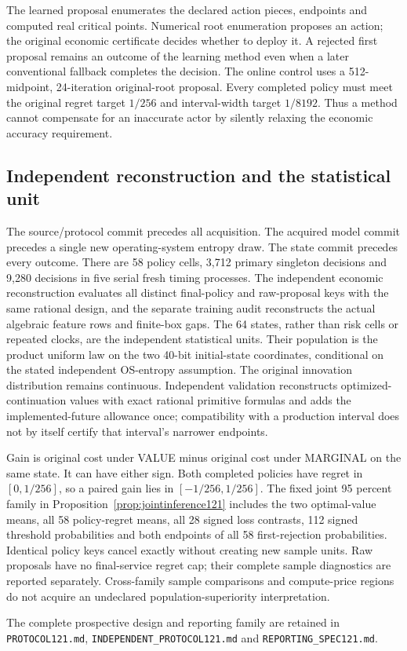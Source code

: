 The learned proposal enumerates the declared action pieces, endpoints and
computed real critical points. Numerical root enumeration proposes an action;
the original economic certificate decides whether to deploy it. A rejected
first proposal remains an outcome of the learning method even when a later
conventional fallback completes the decision. The online control uses a
512-midpoint, 24-iteration original-root proposal. Every completed policy must
meet the original regret target $1/256$ and interval-width target $1/8192$.
Thus a method cannot compensate for an inaccurate actor by silently relaxing
the economic accuracy requirement.

\subsection{Independent reconstruction and the statistical unit}
\label{subsec:validationdesign121}

The source/protocol commit precedes all acquisition. The acquired model
commit precedes a single new operating-system entropy draw. The state commit
precedes every outcome. There are 58 policy cells, 3,712 primary singleton
decisions and 9,280 decisions in five serial fresh timing processes. The
independent economic reconstruction evaluates all distinct final-policy and
raw-proposal keys with the same rational design, and the separate training
audit reconstructs the actual algebraic feature rows and finite-box gaps.
The 64 states, rather than risk cells or repeated clocks, are the independent
statistical units. Their population is the product uniform law on the two
40-bit initial-state coordinates, conditional on the stated independent
OS-entropy assumption. The original innovation distribution remains
continuous. Independent validation reconstructs optimized-continuation values
with exact rational primitive formulas and adds the implemented-future
allowance once; compatibility with a production interval does not by itself
certify that interval's narrower endpoints.

Gain is original cost under VALUE minus original cost under MARGINAL on the
same state. It can have either sign. Both completed policies have regret in
$[0,1/256]$, so a paired gain lies in $[-1/256,1/256]$. The fixed joint
95 percent family in Proposition~\ref{prop:jointinference121} includes the
two optimal-value means, all 58 policy-regret means, all 28 signed loss
contrasts, 112 signed threshold probabilities and both endpoints of all 58
first-rejection probabilities. Identical policy keys cancel exactly without
creating new sample units. Raw proposals have no final-service regret cap;
their complete sample diagnostics are reported separately. Cross-family
sample comparisons and compute-price regions do not acquire an undeclared
population-superiority interpretation.

The complete prospective design and reporting family are
retained in \texttt{PROTOCOL121.md}, \texttt{INDEPENDENT\_PROTOCOL121.md} and
\texttt{REPORTING\_SPEC121.md}.
